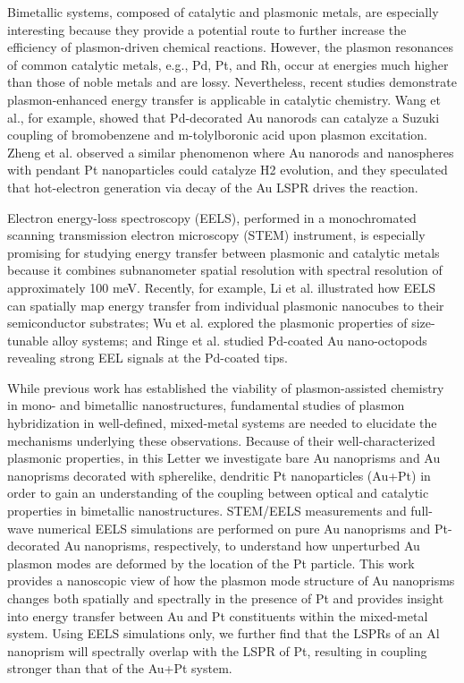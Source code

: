 \documentclass [11pt, proquest] {uwthesis}[2016/11/22]
\begin{document}
Bimetallic systems, composed of catalytic and plasmonic metals, are especially interesting because they provide a potential route to further increase the efficiency of plasmon-driven chemical reactions. However, the plasmon resonances of common catalytic metals, e.g., Pd, Pt, and Rh, occur at energies much higher than those of noble metals and are lossy\cite{Weaver}. Nevertheless, recent studies demonstrate plasmon-enhanced energy transfer is applicable in catalytic chemistry\cite{LinicCharge,LinicDominant,RingeHetero}. Wang et al.\cite{YanSuzuki}, for example, showed that Pd-decorated Au nanorods can catalyze a Suzuki coupling of bromobenzene and m-tolylboronic acid upon plasmon excitation. Zheng et al.\cite{PtAuRods} observed a similar phenomenon where Au nanorods and nanospheres with pendant Pt nanoparticles could catalyze H2 evolution, and they speculated that hot-electron generation via decay of the Au LSPR drives the reaction.

Electron energy-loss spectroscopy (EELS), performed in a monochromated scanning transmission electron microscopy (STEM) instrument, is especially promising for studying energy transfer between plasmonic and catalytic metals because it combines subnanometer spatial resolution with spectral resolution of approximately 100 meV\cite{ARPC}. Recently, for example, Li et al.\cite{CubeSubstrate} illustrated how EELS can spatially map energy transfer from individual plasmonic nanocubes to their semiconductor substrates; Wu et al.\cite{Alloys} explored the plasmonic properties of size-tunable alloy systems; and Ringe et al.\cite{RingeTips} studied Pd-coated Au nano-octopods revealing strong EEL signals at the Pd-coated tips.

While previous work has established the viability of plasmon-assisted chemistry in mono- and bimetallic nanostructures, fundamental studies of plasmon hybridization in well-defined, mixed-metal systems are needed to elucidate the mechanisms underlying these observations. Because of their well-characterized plasmonic properties, in this Letter we investigate bare Au nanoprisms and Au nanoprisms decorated with spherelike, dendritic Pt nanoparticles (Au+Pt) in order to gain an understanding of the coupling between optical and catalytic properties in bimetallic nanostructures\cite{MillstoneSeedless,MillstonePtAu}. STEM/EELS measurements and full-wave numerical EELS simulations are performed on pure Au nanoprisms and Pt-decorated Au nanoprisms, respectively, to understand how unperturbed Au plasmon modes are deformed by the location of the Pt particle. This work provides a nanoscopic view of how the plasmon mode structure of Au nanoprisms changes both spatially and spectrally in the presence of Pt and provides insight into energy transfer between Au and Pt constituents within the mixed-metal system. Using EELS simulations only, we further find that the LSPRs of an Al nanoprism will spectrally overlap with the LSPR of Pt, resulting in coupling stronger than that of the Au+Pt system.
\end{document}
